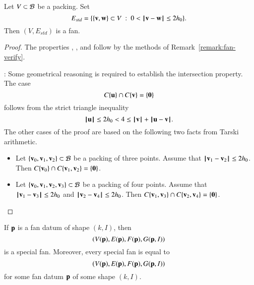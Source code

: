 \begin{lemma}\label{lemma:ctc-fan}
Let $V\subset \BB$ be a packing.  Set 
$$E_{std} = \{\{\v,\w\}\subset V\mid 0 < \norm{\v}{\w} \le 2\hm\}.$$
Then $(V,E_{std})$ is a fan.
\end{lemma}
%

\begin{proof}
The properties , , and  follow
by the methods of Remark~\ref{remark:fan-verify}.

:  Some geometrical reasoning is required to establish the intersection property.   The case
$$
C\{\u\}\cap C\{\v\} = \{\orz\}
$$
follows from the strict triangle inequality 
$$
\normo{\u} \le 2\hm < 4 \le \normo{\v} + \norm{\u}{\v}.
$$
The other cases of the proof are based on the following 
two facts from Tarski arithmetic.
\begin{itemize}
\item Let $\{\v_0,\v_1,\v_2\}\subset \BB$ be a packing of three points.
Assume that $\norm{\v_1}{\v_2}\le 2\hm$.  Then
$C\{\v_0\}\cap C\{\v_1,\v_2\} = \{\orz\}$.
\item Let $\{\v_0,\v_1,\v_2,\v_3\}\subset \BB$ be a packing of four points.
Assume that $\norm{\v_1}{\v_3}\le 2\hm$ and $\norm{\v_2}{\v_4}\le 2\hm$.
Then $C\{\v_1,\v_3\}\cap C\{\v_2,\v_4\} = \{\orz\}$.
\end{itemize}
\end{proof}

\begin{lemma}
If $\p$ is a fan datum of shape $(k,I)$, then
$$
(V(\p),E(\p),F(\p),G(\p,I))
$$
is a special fan.  Moreover, every special fan is equal to
$$
(V(\p),E(\p),F(\p),G(\p,I))
$$
for some fan datum $\p$ of some shape $(k,I)$.
\end{lemma}

